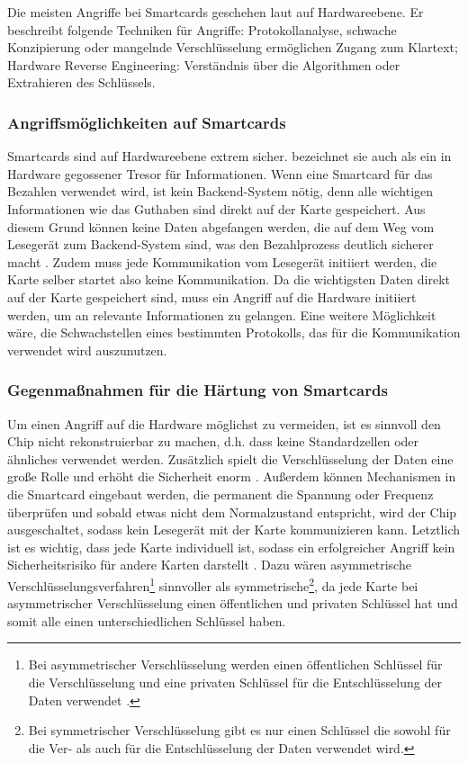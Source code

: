 Die meisten Angriffe bei Smartcards geschehen laut \cite{refmas:ASSS} auf Hardwareebene. Er beschreibt folgende 
Techniken für Angriffe: Protokollanalyse, schwache Konzipierung oder mangelnde Verschlüsselung ermöglichen Zugang 
zum Klartext; Hardware Reverse Engineering: Verständnis über die Algorithmen oder Extrahieren des Schlüssels.


\subsubsection{Angriffsmöglichkeiten auf Smartcards}
Smartcards sind auf Hardwareebene extrem sicher. \cite{refmas:ASSS} bezeichnet sie auch als ein in Hardware gegossener
Tresor für Informationen. Wenn eine Smartcard für das Bezahlen verwendet wird, ist kein Backend-System nötig,
denn alle wichtigen Informationen wie das Guthaben sind direkt auf der Karte gespeichert. Aus diesem Grund können
keine Daten abgefangen werden, die auf dem Weg vom Lesegerät zum Backend-System sind, was den Bezahlprozess
deutlich sicherer macht \cite{refbook:WRHC}. Zudem muss jede Kommunikation vom Lesegerät initiiert werden, 
die Karte selber startet also keine Kommunikation. Da die wichtigsten Daten direkt auf der Karte gespeichert sind,
muss ein Angriff auf die Hardware initiiert werden, um an relevante Informationen zu gelangen. Eine weitere 
Möglichkeit wäre, die Schwachstellen eines bestimmten Protokolls, das für die Kommunikation verwendet wird auszunutzen.

\subsubsection{Gegenmaßnahmen für die Härtung von Smartcards}
Um einen Angriff auf die Hardware möglichst zu vermeiden, ist es sinnvoll den Chip nicht rekonstruierbar zu machen, d.h. dass
keine Standardzellen oder ähnliches verwendet werden. Zusätzlich spielt die Verschlüsselung der Daten eine große Rolle und 
erhöht die Sicherheit enorm \cite{refst:ARES}. Außerdem können Mechanismen in die Smartcard eingebaut werden, die permanent 
die Spannung oder Frequenz überprüfen und sobald etwas nicht dem Normalzustand entspricht, wird der Chip ausgeschaltet, sodass 
kein Lesegerät mit der Karte kommunizieren kann. Letztlich ist es wichtig, dass jede Karte individuell ist, sodass ein 
erfolgreicher Angriff kein Sicherheitsrisiko für andere Karten darstellt \cite{refmas:ASSS}. Dazu wären asymmetrische 
Verschlüsselungsverfahren\footnote{Bei asymmetrischer Verschlüsselung werden einen öffentlichen Schlüssel für die Verschlüsselung
und eine privaten Schlüssel für die Entschlüsselung der Daten verwendet \cite{refbook:SWIS}.} sinnvoller als 
symmetrische\footnote{Bei symmetrischer Verschlüsselung gibt es nur einen Schlüssel die sowohl für die Ver- als auch
für die Entschlüsselung der Daten verwendet wird\cite{refbook:SWIS}.}, da jede Karte bei asymmetrischer Verschlüsselung einen
öffentlichen und privaten Schlüssel hat und somit alle einen unterschiedlichen Schlüssel haben.


